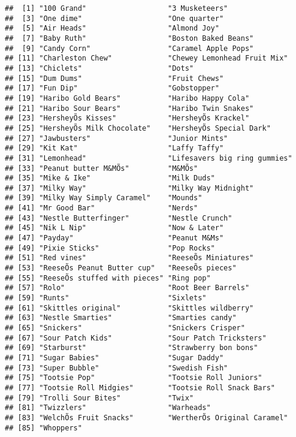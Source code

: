 \documentclass[
]{article}
\begin{document}
\begin{verbatim}
##  [1] "100 Grand"                   "3 Musketeers"               
##  [3] "One dime"                    "One quarter"                
##  [5] "Air Heads"                   "Almond Joy"                 
##  [7] "Baby Ruth"                   "Boston Baked Beans"         
##  [9] "Candy Corn"                  "Caramel Apple Pops"         
## [11] "Charleston Chew"             "Chewey Lemonhead Fruit Mix" 
## [13] "Chiclets"                    "Dots"                       
## [15] "Dum Dums"                    "Fruit Chews"                
## [17] "Fun Dip"                     "Gobstopper"                 
## [19] "Haribo Gold Bears"           "Haribo Happy Cola"          
## [21] "Haribo Sour Bears"           "Haribo Twin Snakes"         
## [23] "HersheyÕs Kisses"            "HersheyÕs Krackel"          
## [25] "HersheyÕs Milk Chocolate"    "HersheyÕs Special Dark"     
## [27] "Jawbusters"                  "Junior Mints"               
## [29] "Kit Kat"                     "Laffy Taffy"                
## [31] "Lemonhead"                   "Lifesavers big ring gummies"
## [33] "Peanut butter M&MÕs"         "M&MÕs"                      
## [35] "Mike & Ike"                  "Milk Duds"                  
## [37] "Milky Way"                   "Milky Way Midnight"         
## [39] "Milky Way Simply Caramel"    "Mounds"                     
## [41] "Mr Good Bar"                 "Nerds"                      
## [43] "Nestle Butterfinger"         "Nestle Crunch"              
## [45] "Nik L Nip"                   "Now & Later"                
## [47] "Payday"                      "Peanut M&Ms"                
## [49] "Pixie Sticks"                "Pop Rocks"                  
## [51] "Red vines"                   "ReeseÕs Miniatures"         
## [53] "ReeseÕs Peanut Butter cup"   "ReeseÕs pieces"             
## [55] "ReeseÕs stuffed with pieces" "Ring pop"                   
## [57] "Rolo"                        "Root Beer Barrels"          
## [59] "Runts"                       "Sixlets"                    
## [61] "Skittles original"           "Skittles wildberry"         
## [63] "Nestle Smarties"             "Smarties candy"             
## [65] "Snickers"                    "Snickers Crisper"           
## [67] "Sour Patch Kids"             "Sour Patch Tricksters"      
## [69] "Starburst"                   "Strawberry bon bons"        
## [71] "Sugar Babies"                "Sugar Daddy"                
## [73] "Super Bubble"                "Swedish Fish"               
## [75] "Tootsie Pop"                 "Tootsie Roll Juniors"       
## [77] "Tootsie Roll Midgies"        "Tootsie Roll Snack Bars"    
## [79] "Trolli Sour Bites"           "Twix"                       
## [81] "Twizzlers"                   "Warheads"                   
## [83] "WelchÕs Fruit Snacks"        "WertherÕs Original Caramel" 
## [85] "Whoppers"
\end{verbatim}
\end{document}
